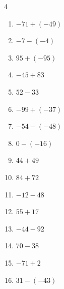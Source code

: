 \begin{multicols}{4}
\begin{enumerate}
        \phantom{$=26$}

  \item $-71+(-49)$

        \phantom{$=-120$}

  \item $-7-(-4)$

        \phantom{$=-3$}

  \item $95+(-95)$

        \phantom{$=0$}

  \item $-45+83$

        \phantom{$=38$}

  \item $52-33$

        \phantom{$=19$}

  \item $-99+(-37)$

        \phantom{$=-136$}

  \item $-54-(-48)$

        \phantom{$=-6$}

  \item $0-(-16)$

        \phantom{$=16$}

  \item $44+49$

        \phantom{$=93$}

  \item $84+72$

        \phantom{$=156$}

  \item $-12-48$

        \phantom{$=-60$}

  \item $55+17$

        \phantom{$=72$}

\columnbreak %

  \item $-44-92$

        \phantom{$=-136$}

  \item $70-38$

        \phantom{$=32$}

  \item $-71+2$

        \phantom{$=-69$}

  \item $31-(-43)$


\end{enumerate}
\end{multicols}
